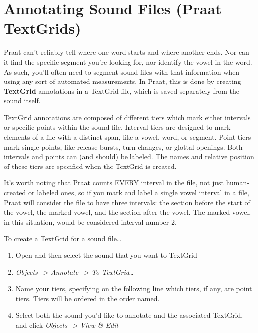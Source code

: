 \documentclass[11pt]{article}
\def\tightlist{}
\begin{document}
\hypertarget{annotating-sound-files-praat-textgrids}{%
\section{Annotating Sound Files (Praat
TextGrids)}\label{annotating-sound-files-praat-textgrids}}

\label{sec:TextGridding}

Praat can't reliably tell where one word starts and where another ends.
Nor can it find the specific segment you're looking for, nor identify
the vowel in the word. As such, you'll often need to segment sound files
with that information when using any sort of automated measurements. In
Praat, this is done by creating \textbf{TextGrid} annotations in a
TextGrid file, which is saved separately from the sound itself.

TextGrid annotations are composed of different tiers which mark either
intervals or specific points within the sound file. Interval tiers are
designed to mark elements of a file with a distinct span, like a vowel,
word, or segment. Point tiers mark single points, like release bursts,
turn changes, or glottal openings. Both intervals and points can (and
should) be labeled. The names and relative position of these tiers are
specified when the TextGrid is created.

It's worth noting that Praat counts EVERY interval in the file, not just
human-created or labeled ones, so if you mark and label a single vowel
interval in a file, Praat will consider the file to have three
intervals: the section before the start of the vowel, the marked vowel,
and the section after the vowel. The marked vowel, in this situation,
would be considered interval number 2.

To create a TextGrid for a sound file\ldots{}

\begin{enumerate}
\def\labelenumi{\arabic{enumi}.}
\tightlist
\item
  Open and then select the sound that you want to TextGrid
\item
  \emph{Objects -\textgreater{} Annotate -\textgreater{} To
  TextGrid\ldots{}}
\item
  Name your tiers, specifying on the following line which tiers, if any,
  are point tiers. Tiers will be ordered in the order named.
\item
  Select both the sound you'd like to annotate and the associated
  TextGrid, and click \emph{Objects -\textgreater{} View \& Edit}
\end{enumerate}
\end{document}
